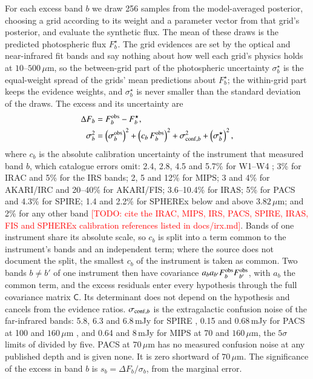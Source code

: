 \documentclass{aa}
\newcommand{\todo}[1]{\textcolor{red}{[TODO: #1]}}
\begin{document}
For each excess band $b$ we draw 256 samples from the model-averaged posterior,
choosing a grid according to its weight and a parameter vector from that grid's
posterior, and evaluate the synthetic flux. The mean of these draws is the
predicted photospheric flux $F^\star_b$. The grid evidences are set by the optical
and near-infrared fit bands and say nothing about how well each grid's physics
holds at $10$--$500\,\mu$m, so the between-grid part of the photospheric
uncertainty $\sigma^\star_b$ is the equal-weight spread of the grids' mean
predictions about $F^\star_b$; the within-grid part keeps the evidence weights, and
$\sigma^\star_b$ is never smaller than the standard deviation of the draws. The
excess and its uncertainty are
\begin{equation}
  \begin{aligned}
  \Delta F_b &= F^{\rm obs}_b - F^\star_b , \\
  \sigma_b^2 &= \left(\sigma^{\rm obs}_b\right)^2 + \left(c_b\,F^{\rm obs}_b\right)^2
             + \sigma_{{\rm conf},b}^2 + \left(\sigma^\star_b\right)^2 ,
  \end{aligned}
  \label{eq:excess}
\end{equation}
where $c_b$ is the absolute calibration uncertainty of the instrument that
measured band $b$, which catalogue errors omit: 2.4, 2.8, 4.5 and 5.7\% for W1--W4
\citep{jarrett2011}; 3\% for IRAC and 5\% for the IRS bands; 2, 5 and 12\% for
MIPS; 3 and 4\% for AKARI/IRC \citep{ishihara2010} and 20--40\% for AKARI/FIS;
3.6--10.4\% for IRAS; 5\% for PACS and 4.3\% for SPIRE; 1.4 and 2.2\% for SPHEREx
below and above $3.82\,\mu$m; and 2\% for any other band \todo{cite the IRAC, MIPS, IRS, PACS, SPIRE, IRAS, FIS and
SPHEREx calibration references listed in docs/irx.md}. Bands of one instrument
share its absolute scale, so $c_b$ is split into a term common to the instrument's
bands and an independent term; where the source does not document the split, the
smallest $c_b$ of the instrument is taken as common. Two bands $b \ne b'$ of one
instrument then have covariance $a_b a_{b'} F^{\rm obs}_b F^{\rm obs}_{b'}$, with
$a_b$ the common term, and the excess residuals enter every hypothesis through
the full covariance matrix $\mathsf{C}$. Its determinant does not depend on the
hypothesis and cancels from the evidence ratios. $\sigma_{{\rm conf},b}$ is the extragalactic confusion
noise of the far-infrared bands: 5.8, 6.3 and 6.8\,mJy for SPIRE
\citep{nguyen2010}, 0.15 and 0.68\,mJy for PACS at 100 and $160\,\mu$m
\citep{magnelli2013}, and 0.64 and 8\,mJy for MIPS at 70 and $160\,\mu$m, the
$5\sigma$ limits of \citet{dole2004} divided by five. PACS at $70\,\mu$m has no
measured confusion noise at any published depth \citep{berta2011} and is given
none. It is zero shortward of $70\,\mu$m. The significance of the
excess in band $b$ is $s_b = \Delta F_b/\sigma_b$, from the marginal error.
\end{document}
